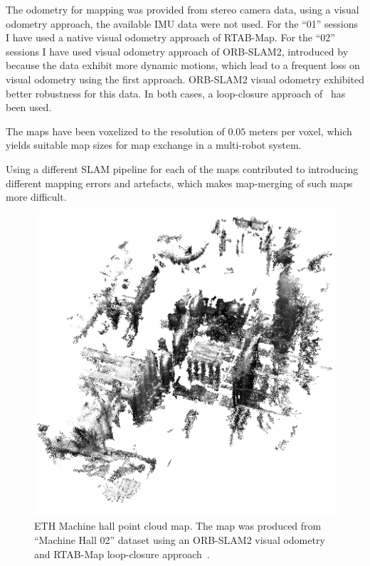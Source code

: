 The odometry for mapping was provided from stereo camera data, using a visual odometry approach, the available \gls{IMU} data were not used. For the ``01'' sessions I have used a native visual odometry approach of RTAB-Map. For the ``02'' sessions I have used visual odometry approach of {ORB-SLAM2}, introduced by~\citet{mur2017orb} because the data exhibit more dynamic motions, which lead to a frequent loss on visual odometry using the first approach. {ORB-SLAM2} visual odometry exhibited better robustness for this data. In both cases, a loop-closure approach of~\citet{labbe2014online} has been used.

The maps have been voxelized to the resolution of $0.05$ meters per voxel, which yields suitable map sizes for map exchange in a multi-robot system.

Using a different \gls{SLAM} pipeline for each of the maps contributed to introducing different mapping errors and artefacts, which makes map-merging of such maps more difficult.

\begin{figure}
    \centering
    \includegraphics[width=\textwidth]{../img/euroc_mh_02.png}
    \caption[Machine hall point cloud map]{ETH Machine hall point cloud map. The map was produced from ``Machine Hall 02'' dataset using an {ORB-SLAM2} visual odometry~\citep{mur2017orb} and RTAB-Map loop-closure approach~\citep{labbe2014online}.}
    \label{fig:euroc_mh_02}
\end{figure}

